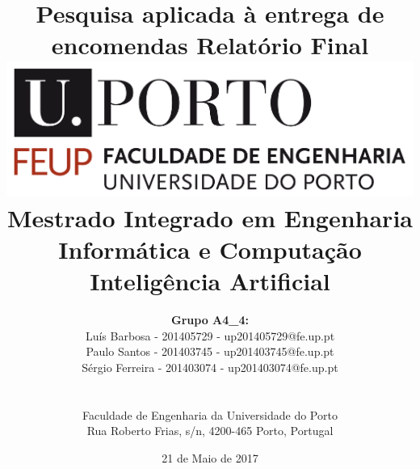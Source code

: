 \documentclass[a4paper]{article}
\begin{document}
\setlength{\textwidth}{16cm}
\setlength{\textheight}{22cm}

\title{\Huge\textbf{Pesquisa aplicada à entrega de encomendas}\linebreak\linebreak\linebreak
\Large\textbf{Relatório Final}\linebreak\linebreak
\linebreak\linebreak
\includegraphics[scale=0.1]{feup-logo.png}\linebreak\linebreak
\linebreak\linebreak
\Large{Mestrado Integrado em Engenharia Informática e Computação} \linebreak\linebreak
\Large{Inteligência Artificial}\linebreak
}

\author{\textbf{Grupo A4\_4:}\\ Luís  Barbosa - 201405729 - up201405729@fe.up.pt\\ Paulo Santos - 201403745 - up201403745@fe.up.pt \\ Sérgio Ferreira - 201403074 - up201403074@fe.up.pt \\\linebreak\linebreak \\
 \\ Faculdade de Engenharia da Universidade do Porto \\ Rua Roberto Frias, s/n, 4200-465 Porto, Portugal \linebreak\linebreak\linebreak
\linebreak\linebreak\vspace{1cm}}
\date{21 de Maio de 2017}
\maketitle
\thispagestyle{empty}
\end{document}

